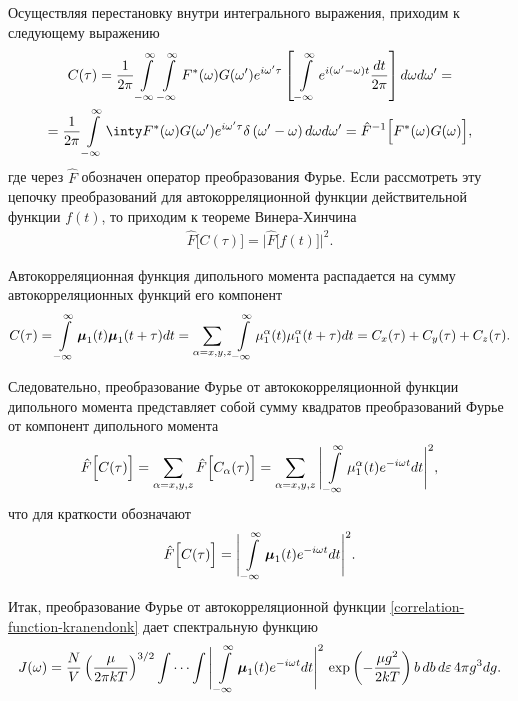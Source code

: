 Осуществляя перестановку внутри интегрального выражения, приходим к следующему выражению 
\begin{gather}
    C(\tau) = \frac{1}{2\pi} \intty \intty F^*(\omega) G(\omega^\prime) e^{i \omega^\prime \tau} \lsq \, \intty e^{i (\omega^\prime - \omega) t} \frac{dt}{2 \pi} \rsq d\omega d\omega^\prime = \notag \\
    = \frac{1}{2\pi} \intty \inty F^*(\omega) G(\omega^\prime) e^{i \omega^\prime \tau} \delta \lb \omega^\prime - \omega \rb d\omega d\omega^\prime = \hat{F}^{-1} \Big[ F^*(\omega) G(\omega) \Big],
\end{gather}
%
где через $\hat{F}$ обозначен оператор преобразования Фурье. Если рассмотреть эту цепочку преобразований для автокорреляционной функции действительной функции $f(t)$, то приходим к теореме Винера-Хинчина \cite{frommhold}
\begin{gather}
    \hat{F} \Big[ C(\tau) \Big] = \Big\vert \hat{F}\Big[ f(t) \Big] \Big\vert^2. 
\end{gather}

Автокорреляционная функция дипольного момента распадается на сумму автокорреляционных функций его компонент
\begin{gather}
    C(\tau) = \int\limits_{-\infty}^\infty \boldsymbol{\mu}_1(t) \boldsymbol{\mu}_1(t + \tau) dt = \sum_{\alpha = x, y, z} \int\limits_{-\infty}^\infty \mu_1^\alpha(t) \mu_1^\alpha(t + \tau) dt = C_x(\tau) + C_y(\tau) + C_z(\tau).
\end{gather}

Следовательно, преобразование Фурье от автококорреляционной функции дипольного момента представляет собой сумму квадратов преобразований Фурье от компонент дипольного момента
\begin{gather}
    \hat{F}\Big[ C(\tau) \Big] = \sum_{\alpha = x,y,z} \hat{F} \Big[ C_\alpha(\tau) \Big] = \sum_{\alpha=x,y,z} \Bigg\vert \int\limits_{-\infty}^\infty \mu_1^\alpha(t) e^{-i\omega t} dt \Bigg\vert^2,
\end{gather}
% 
что для краткости обозначают 
\begin{gather}
    \hat{F} \Big[ C(\tau) \Big] = \Bigg\vert \int\limits_{-\infty}^\infty \boldsymbol{\mu}_1(t) e^{-i\omega t} dt \Bigg\vert^2.
\end{gather}

Итак, преобразование Фурье от автокорреляционной функции \eqref{correlation-function-kranendonk} дает спектральную функцию  
\begin{gather}
    J(\omega) = \frac{N}{V} \left( \frac{\mu}{2 \pi k T} \right)^{3/2} \idotsint \Bigg\vert \int\limits_{-\infty}^\infty \boldsymbol{\mu}_1(t) e^{-i \omega t} dt \Bigg\vert^2 \, \exp \left( -\frac{\mu g^2}{2 k T} \right) b \, db \, d \varepsilon \, 4 \pi g^3 dg.
\end{gather}

